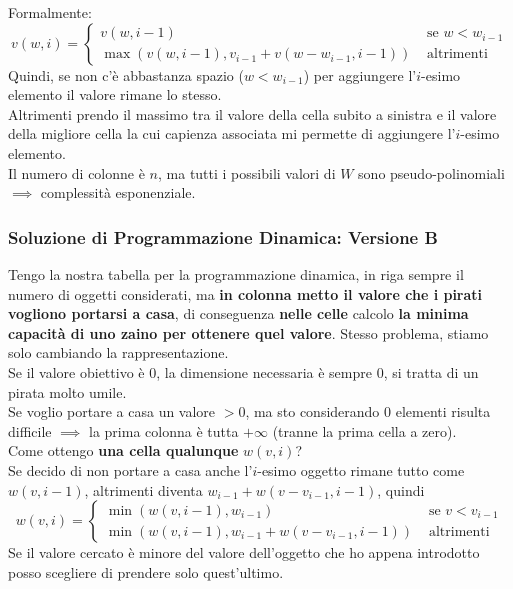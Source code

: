 \documentclass[11pt]{article}
\begin{document}
	Formalmente:
	$$
	v (w,i) = \begin{cases}
		v (w, i-1) & \text{ se } w < w_{i-1} \\
		\max \left(v(w,i-1), v_{i-1} + v (w - w_{i-1}, i-1)\right) & \text{ altrimenti }
	\end{cases}
	$$
	Quindi, se non c'è abbastanza spazio ($w < w_{i-1}$) per aggiungere l'$i$-esimo elemento il valore rimane lo stesso.\\
	
	Altrimenti prendo il massimo tra il valore della cella subito a sinistra e il valore della migliore cella la cui capienza associata mi permette di aggiungere l'$i$-esimo elemento.\\
	
	Il numero di colonne è $n$, ma tutti i possibili valori di $W$ sono pseudo-polinomiali $\implies$ complessità esponenziale.\\
	
	\newpage
	
	\subsubsection{Soluzione di Programmazione Dinamica: Versione B}
	
	Tengo la nostra tabella per la programmazione dinamica, in riga sempre il numero di oggetti considerati, ma \textbf{in colonna metto il valore che i pirati vogliono portarsi a casa}, di conseguenza \textbf{nelle celle} calcolo \textbf{la minima capacità di uno zaino per ottenere quel valore}. Stesso problema, stiamo solo cambiando la rappresentazione.\\
	
	Se il valore obiettivo è 0, la dimensione necessaria è sempre 0, si tratta di un pirata molto umile.\\
	Se voglio portare a casa un valore $>0$, ma sto considerando $0$ elementi risulta difficile $\implies$ la prima colonna è tutta $+ \infty$ (tranne la prima cella a zero).\\
	
	Come ottengo \textbf{una cella qualunque} $w(v,i)$?\\
	
	Se decido di non portare a casa anche l'$i$-esimo oggetto rimane tutto come $w(v, i-1)$, altrimenti diventa $w_{i-1} + w (v - v_{i-1}, i-1)$, quindi
	$$ w (v,i) = \begin{cases}
		\min \left(w (v, i-1), w_{i-1}\right) & \text { se } v < v_{i-1} \\
		\min \left(w (v, i-1), w_{i-1} + w (v - v_{i-1}, i-1) \right) & \text{ altrimenti }
	\end{cases}$$
	Se il valore cercato è minore del valore dell'oggetto che ho appena introdotto posso scegliere di prendere solo quest'ultimo.\\
	
\end{document}
